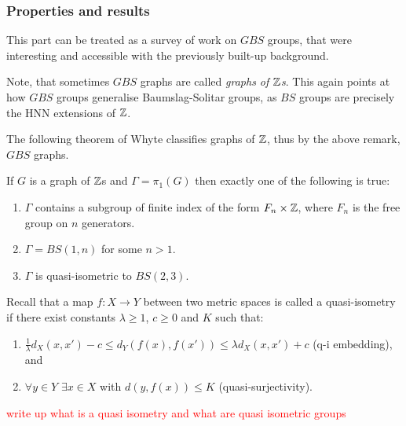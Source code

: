\subsubsection{Properties and results}

This part can be treated as a survey of work on $GBS$ groups, that were interesting and accessible with the previously built-up background.

\begin{remark}
    Note, that sometimes $GBS$ graphs are called \emph{graphs of $\mathbb{Z}$s}. This again points at how $GBS$ groups generalise Baumslag-Solitar groups, as $BS$ groups are precisely the HNN extensions of $\mathbb{Z}$.
\end{remark}

The following theorem of Whyte classifies graphs of $\mathbb{Z}$, thus by the above remark, $GBS$ graphs.

\begin{theorem}\cite[Theorem 0.1]{WH01}
    If $G$ is a graph of $\mathbb{Z}$s and $\Gamma = \pi_1(G)$ then exactly one of the following is true:
    \begin{enumerate}
        \item $\Gamma$ contains a subgroup of finite index of the form $F_n \times \mathbb{Z}$, where $F_n$ is the free group on $n$ generators.
        \item $\Gamma = BS(1,n)$ for some $n > 1$.
        \item $\Gamma$ is quasi-isometric to $BS(2,3)$.
    \end{enumerate}
\end{theorem}

\begin{remark}
    Recall that a map $f: X \to Y$ between two metric spaces is called a quasi-isometry if there exist constants $\lambda \ge 1$, $c \ge 0$ and $K$ such that:
    \begin{enumerate}
        \item $\frac{1}{\lambda}d_X(x,x') - c \le d_Y(f(x),f(x')) \le \lambda d_X(x,x') + c$ (q-i embedding), and
        \item $\forall y \in Y$ $ \exists x \in X$ with $d(y,f(x)) \le K$ (quasi-surjectivity).
    \end{enumerate}
\end{remark}

\textcolor{red}{write up what is a quasi isometry and what are quasi isometric groups}


